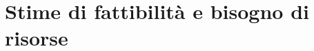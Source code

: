 \documentclass[../SpecificaTecnica.tex]{subfiles}
\begin{document}
\section{Stime di fattibilità e bisogno di risorse}
	
\end{document}
